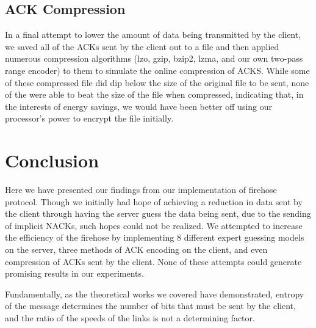 \documentclass[conference]{IEEEtran}
\begin{document}
\subsection{ACK Compression}

In a final attempt to lower the amount of data being transmitted by 
the client, we saved all of the ACKs sent by the client out to a file and
then applied numerous compression algorithms (lzo, gzip, bzip2, lzma, 
and our own two-pass range encoder) to them to simulate the online
compression of ACKS.  While some of these compressed file did dip below the 
size of the original file to be sent, none of the were able to beat the 
size of the file when compressed, indicating that, in the interests of 
energy savings, we would have been better off using our processor's power
to encrypt the file initially.

\section{Conclusion}

Here we have presented our findings from our implementation of firehose 
protocol.  Though we initially had hope of achieving a reduction in data
sent by the client through having the server guess the data being sent, due to
the sending of implicit NACKs, such hopes could not be realized.  We attempted
to increase the efficiency of the firehose by implementing 8 different expert 
guessing models on the server, three methods of ACK encoding on the client, 
and even compression of ACKs sent by the client.  None of these attempts could
generate promising results in our experiments.

Fundamentally, as the theoretical works we covered have demonstrated,
entropy of the message determines the number of bits that must be sent
by the client, and the ratio of the speeds of the links is not
a determining factor.

%
%
\end{document}
